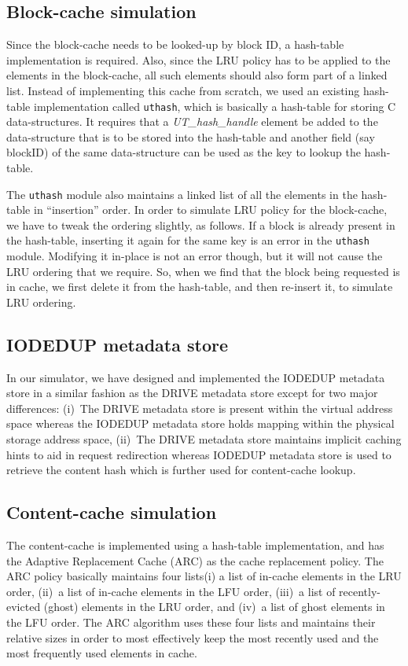 \subsection{Block-cache simulation}
Since the block-cache needs to be looked-up by block ID, a hash-table
implementation is required. Also, since the LRU policy has to be applied
to the elements in the block-cache, all such elements should also form
part of a linked list. Instead of implementing this cache from scratch,
we used an existing hash-table implementation called 
\texttt{uthash}\cite{uthash}, which is basically a hash-table for 
storing C data-structures. It requires that a \textit{UT\_hash\_handle}
element be added to the data-structure that is to be stored into the
hash-table and another field (say blockID) of the same data-structure 
can be used as the key to lookup the hash-table. 

The \texttt{uthash}
module also maintains a linked list of all the elements in the hash-table
in ``insertion'' order. In order to simulate LRU policy for the
block-cache, we have to tweak the ordering slightly, as follows.
If a block is already present in the hash-table, inserting it again
for the same key is an error in the \texttt{uthash} module. Modifying it 
in-place is not an error though, but it will not cause the LRU ordering
that we require. So, when we find that the block being requested is in cache,
we first delete it from the hash-table, and then re-insert it,
to simulate LRU ordering.

\subsection{IODEDUP metadata store}
In our simulator, we have designed and implemented the IODEDUP metadata
store in a similar fashion as the DRIVE metadata store except for two 
major differences: (i)~The DRIVE metadata store is present within the
virtual address space whereas the IODEDUP metadata store holds mapping
within the physical storage address space, (ii)~The DRIVE metadata store
maintains implicit caching hints to aid in request redirection whereas IODEDUP
metadata store is used to retrieve the content hash which is further used
for content-cache lookup.

\subsection{Content-cache simulation}
The content-cache is implemented using a hash-table implementation,
and has the Adaptive Replacement Cache (ARC) as the cache replacement
policy. The ARC policy basically maintains four lists\textemdash{}(i) a list of
in-cache elements in the LRU order, (ii)~a list of in-cache elements
in the LFU order, (iii)~a list of recently-evicted (ghost) elements 
in the LRU order, and (iv)~a list of ghost elements in the LFU order.
The ARC algorithm uses these four lists and maintains their relative
sizes in order to most effectively keep the most recently used and
the most frequently used elements in cache. 

